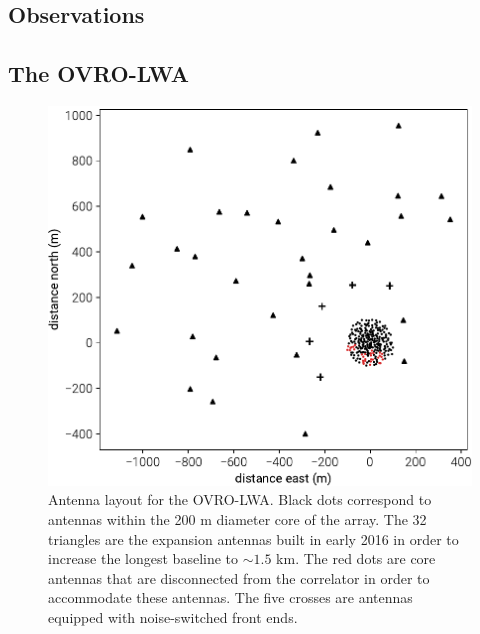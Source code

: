 \begin{bibunit}
\section{Observations}\label{sec:observations}

\subsection{The OVRO-LWA}

\begin{figure}[t]
    \includegraphics[width=\columnwidth]{figures/chapter3/antenna-layout}
    \caption{
        Antenna layout for the OVRO-LWA. Black dots correspond to antennas within the 200 m diameter
        core of the array. The 32 triangles are the expansion antennas built in early 2016 in order
        to increase the longest baseline to $\sim1.5$ km. The red dots are core antennas that are
        disconnected from the correlator in order to accommodate these antennas. The five crosses
        are antennas equipped with noise-switched front ends.
    }
    \label{fig:antenna-layout}
\end{figure}


\end{bibunit}
